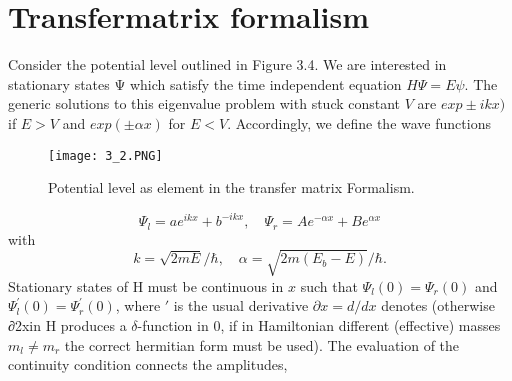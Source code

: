 \section{Transfermatrix formalism}
Consider the potential level outlined in Figure 3.4. We are interested in stationary states Ψ which satisfy the time independent equation $H\Psi = E\psi$. The generic solutions to this eigenvalue problem with stuck constant $V$ are $exp \pm ikx)$ if $E> V$ and $exp (\pm αx)$ for $E <V$. Accordingly, we define the wave functions
\begin{figure}[ht]
    \centering
    \texttt{[image: 3\_2.PNG]}
    \caption{Potential level as element in the transfer matrix
    Formalism.}
    \label{fig:3_4}
\end{figure}
\begin{equation}
    \Psi_l=ae^{ikx}+b^{-ikx},\quad \Psi_r=Ae^{-\alpha x}+Be^{\alpha x}
\end{equation}
with
\begin{equation}
    k=\sqrt{2mE}/\hbar,\quad \alpha=\sqrt{2m(E_b-E)}/\hbar.
\end{equation}
Stationary states of H must be continuous in $x$ such that $\Psi_l (0) = \Psi_r (0)$ and $\Psi_l^{\prime} (0) = \Psi_r^{\prime} (0)$, where $\prime$ is the usual derivative $\partial x = d / dx$ denotes (otherwise ∂2xin H produces a $\delta$-function in $0$, if in Hamiltonian different (effective) masses $m_l \neq m_r$ the correct hermitian form must be used). The evaluation of the continuity condition connects the amplitudes,
